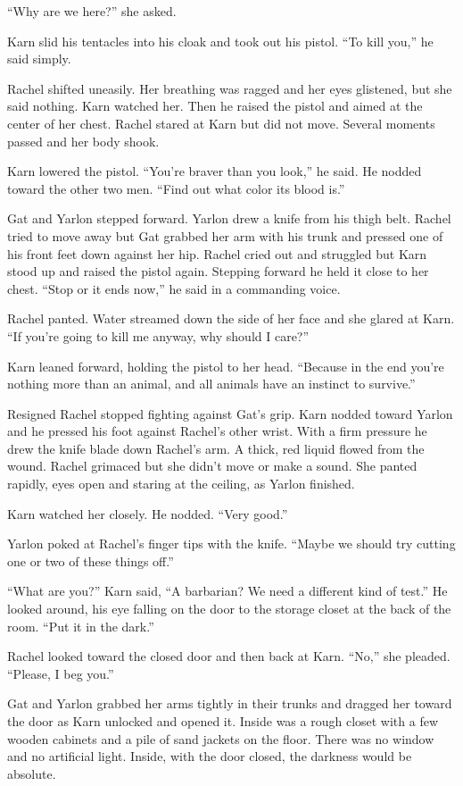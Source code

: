 ``Why are we here?'' she asked.

Karn slid his tentacles into his cloak and took out his pistol. ``To kill you,'' he said simply.

Rachel shifted uneasily. Her breathing was ragged and her eyes glistened, but she said nothing.
Karn watched her. Then he raised the pistol and aimed at the center of her chest. Rachel stared
at Karn but did not move. Several moments passed and her body shook.

Karn lowered the pistol. ``You're braver than you look,'' he said. He nodded toward the other
two men. ``Find out what color its blood is.''

Gat and Yarlon stepped forward. Yarlon drew a knife from his thigh belt. Rachel tried to move
away but Gat grabbed her arm with his trunk and pressed one of his front feet down against her
hip. Rachel cried out and struggled but Karn stood up and raised the pistol again. Stepping
forward he held it close to her chest. ``Stop or it ends now,'' he said in a commanding voice.

Rachel panted. Water streamed down the side of her face and she glared at Karn. ``If you're
going to kill me anyway, why should I care?''

Karn leaned forward, holding the pistol to her head. ``Because in the end you're nothing more
than an animal, and all animals have an instinct to survive.''

Resigned Rachel stopped fighting against Gat's grip. Karn nodded toward Yarlon and he pressed
his foot against Rachel's other wrist. With a firm pressure he drew the knife blade down
Rachel's arm. A thick, red liquid flowed from the wound. Rachel grimaced but she didn't move or
make a sound. She panted rapidly, eyes open and staring at the ceiling, as Yarlon finished.

Karn watched her closely. He nodded. ``Very good.''

Yarlon poked at Rachel's finger tips with the knife. ``Maybe we should try cutting one or two of
these things off.''

``What are you?'' Karn said, ``A barbarian? We need a different kind of test.'' He looked
around, his eye falling on the door to the storage closet at the back of the room. ``Put it in
the dark.''

Rachel looked toward the closed door and then back at Karn. ``No,'' she pleaded. ``Please, I beg
you.''

Gat and Yarlon grabbed her arms tightly in their trunks and dragged her toward the door as Karn
unlocked and opened it. Inside was a rough closet with a few wooden cabinets and a pile of sand
jackets on the floor. There was no window and no artificial light. Inside, with the door closed,
the darkness would be absolute.

